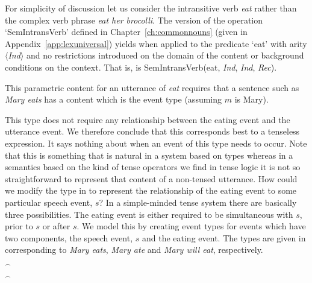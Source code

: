 For simplicity of discussion let us consider the intransitive verb
\textit{eat} rather than the complex verb phrase \textit{eat her
  brocolli}.  The version of the operation `SemIntransVerb' defined in
Chapter~\ref{ch:commonnouns} (given in
Appendix~\ref{app:lexuniversal}) yields \nexteg{} when applied to the
predicate `eat' with arity $\langle$\textit{Ind}$\rangle$ and no
restrictions introduced on the domain of the content or background
conditions on the context.  That is, \nexteg{} is SemIntransVerb(eat,
\textit{Ind}, \textit{Ind}, \textit{Rec}).
\begin{ex} 
\label{ex:SemIntransVerbeat}
\end{ex} 
This parametric content for an utterance of \textit{eat} requires that
a sentence such as \textit{Mary eats} has a content which is the event
type \nexteg{} (assuming $m$ is Mary).
\begin{ex} 
\label{ex:typeMaryeat}
\end{ex} 
This type does not require any relationship between the eating event
and the utterance event.  We therefore conclude that this corresponds
best to a tenseless  expression.  It says nothing about when an event
of this type needs to occur.  Note that this is something that is
natural in a system based on types whereas in a semantics based on the
kind of tense operators we find in tense logic it is not so
straightforward to represent that content of a non-tensed utterance.
How could we modify the type in \preveg{} to represent the
relationship of the eating event to some particular speech event, $s$?
In a simple-minded tense system there are basically three
possibilities. The eating event is either required to be simultaneous
with $s$, prior to $s$ or after $s$.  We model this by creating event
types for events which have two components, the speech event, $s$ and
the eating event.  The types are given in  corresponding
to \textit{Mary eats}, \textit{Mary ate} and \textit{Mary will eat}, respectively.
\begin{ex} 
\begin{subex} 
 
\item {} 
 
\item
  $^{\frown}$

\item {}$^{\frown}$
 
\end{subex} 
   
\end{ex} 
